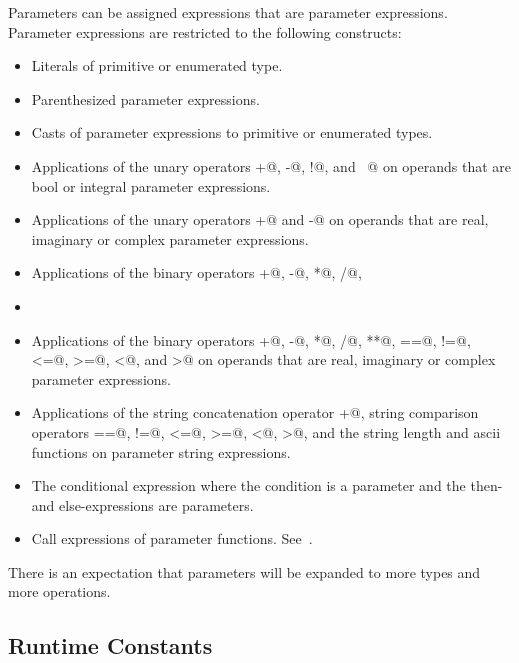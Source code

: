 Parameters can be assigned expressions that are parameter expressions.
Parameter expressions are restricted to the following constructs:
\begin{itemize}
\item
 Literals of primitive or enumerated type.
\item
 Parenthesized parameter expressions.
\item
 Casts of parameter expressions to primitive or enumerated types.
\item
 Applications of the unary operators \verb@+@, \verb@-@, \verb@!@,
 and \verb@~@ on operands that are bool or integral parameter
 expressions.
\item
 Applications of the unary operators \verb@+@ and \verb@-@ on operands that are
 real, imaginary or complex parameter
 expressions.
\item
 Applications of the binary operators \verb@+@, \verb@-@, \verb@*@, \verb@/@, \verb@%@, \verb@**@, \verb@&&@, \verb@||@, \verb@&@, \verb@|@, \verb@^@, \verb@<<@, \verb@>>@, \verb@==@, \verb@!=@, \verb@<=@, \verb@>=@, \verb@<@, and \verb@>@ on operands that are bool or integral parameter expressions.
\item
\item
 Applications of the binary
 operators \verb@+@, \verb@-@, \verb@*@, \verb@/@, \verb@**@, \verb@==@, \verb@!=@, \verb@<=@, \verb@>=@, \verb@<@,
 and \verb@>@ on operands that are real, imaginary or complex parameter expressions.
\item
 Applications of the string concatenation operator \verb@+@, string comparison operators \verb@==@, \verb@!=@, \verb@<=@, \verb@>=@, \verb@<@, \verb@>@, and the string length and ascii functions on parameter string expressions.
\item
 The conditional expression where the condition is a parameter and the
 then- and else-expressions are parameters.
\item
 Call expressions of parameter functions.  See~.
\end{itemize}

\begin{openissue}
There is an expectation that parameters will be expanded to more types
and more operations.
\end{openissue}

\subsection{Runtime Constants}
\label{Runtime_Constants}

